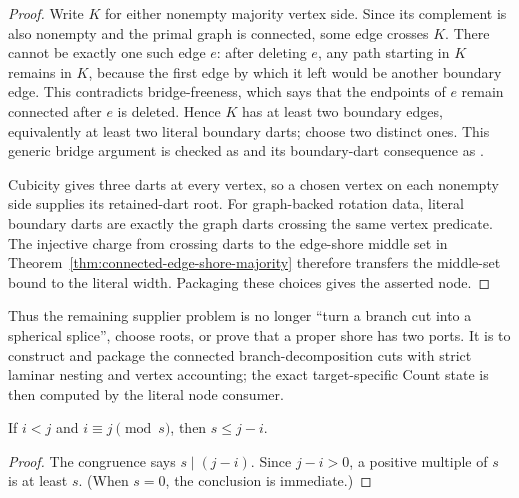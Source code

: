 \begin{proof}
Write \(K\) for either nonempty majority vertex side.  Since its complement
is also nonempty and the primal graph is connected, some edge crosses
\(K\).  There cannot be exactly one such edge \(e\): after deleting \(e\),
any path starting in \(K\) remains in \(K\), because the first edge by which
it left would be another boundary edge.  This contradicts bridge-freeness,
which says that the endpoints of \(e\) remain connected after \(e\) is
deleted.  Hence \(K\) has at least two boundary edges, equivalently at least
two literal boundary darts; choose two distinct ones.  This generic bridge
argument is checked as
and its boundary-dart consequence as
.

Cubicity gives three darts at every vertex, so a chosen vertex on each
nonempty side supplies its retained-dart root.  For graph-backed rotation
data, literal boundary darts are exactly the graph darts crossing the same
vertex predicate.  The injective charge from crossing darts to the edge-shore
middle set in Theorem~\ref{thm:connected-edge-shore-majority} therefore
transfers the middle-set bound to the literal width.  Packaging these choices
gives the asserted node.
\end{proof}

Thus the remaining supplier problem is no longer ``turn a branch cut into a
spherical splice'', choose roots, or prove that a proper shore has two ports.
It is to construct and package the connected branch-decomposition cuts with
strict laminar nesting and vertex accounting; the exact target-specific
Count state is then computed by the literal node consumer.

\begin{lemma}
\label{lem:equal-depth-phases-separated}
If \(i<j\) and \(i\equiv j\pmod s\), then \(s\le j-i\).
\end{lemma}

\begin{proof}
The congruence says \(s\mid(j-i)\).  Since \(j-i>0\), a positive multiple
of \(s\) is at least \(s\).  (When \(s=0\), the conclusion is immediate.)
\end{proof}

